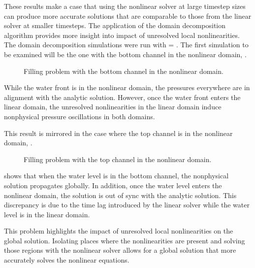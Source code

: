 These results make a case that using the nonlinear solver at large timestep sizes can produce more accurate solutions that are comparable to those from the linear solver at smaller timesteps.
The application of the domain decomposition algorithm provides more insight into impact of unresolved local nonlinearities.
The domain decomposition simulations were run with \dtmax{} = .
The first simulation to be examined will be the one with the bottom channel in the nonlinear domain, .

\begin{figure}[h!t]
\centering

\caption{Filling problem with the bottom channel in the nonlinear domain.}
\label{fig:vmpDDBotChan}
\end{figure}

While the water front is in the nonlinear domain, the pressures everywhere are in alignment with the analytic solution.
However, once the water front enters the linear domain, the unresolved nonlinearities in the linear domain induce nonphysical pressure oscillations in both domains.

This result is mirrored in the case where the top channel is in the nonlinear domain, .

\begin{figure}[h!t]
\centering

\caption{Filling problem with the top channel in the nonlinear domain.}
\label{fig:vmpDDTopChan}
\end{figure}


 shows that when the water level is in the bottom channel, the nonphysical solution propagates globally.
In addition, once the water level enters the nonlinear domain, the solution is out of sync with the analytic solution.
This discrepancy is due to the time lag introduced by the linear solver while the water level is in the linear domain.

This problem highlights the impact of unresolved local nonlinearities on the global solution.
Isolating places where the nonlinearities are present and solving those regions with the nonlinear solver allows for a global solution that more accurately solves the nonlinear equations.

